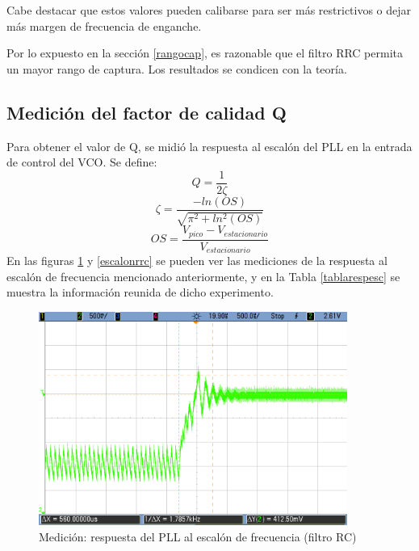 Cabe destacar que estos valores pueden calibarse para ser más restrictivos o dejar más margen de frecuencia de enganche.

Por lo expuesto en la sección \ref{rangocap}, es razonable que el filtro RRC permita un mayor rango de captura. Los resultados se condicen con la teoría.

\subsection{Medición del factor de calidad Q}
Para obtener el valor de Q, se midió la respuesta al escalón del PLL en la entrada de control del VCO. Se define:
\begin{equation}
    Q=\frac{1}{2\zeta}
\end{equation}
\begin{equation}
    \zeta=\frac{-ln(OS)}{\sqrt{\pi^2+ln^2(OS)}}
\end{equation}
\begin{equation}
    OS=\frac{V_{pico}-V_{estacionario}}{V_{estacionario}}
\end{equation}
En las figuras \ref{escalonrc} y \ref{escalonrrc} se pueden ver las mediciones de la respuesta al escalón de frecuencia mencionado anteriormente, y en la Tabla \ref{tablarespesc} se muestra la información reunida de dicho experimento.


\begin{figure}[H]
    \centering
    \includegraphics[width=0.9\textwidth]{resources/escalonrc.png}
    \caption{Medición: respuesta del PLL al escalón de frecuencia (filtro RC)}
    \label{escalonrc}
\end{figure}

